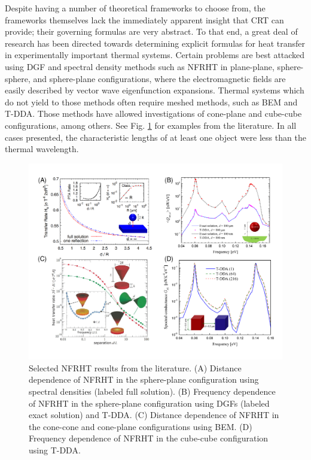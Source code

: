 Despite having a number of theoretical frameworks to choose from, the frameworks themselves lack the immediately apparent insight that CRT can provide; their governing formulas are very abstract. To that end, a great deal of research has been directed towards determining explicit formulas for heat transfer in experimentally important thermal systems. Certain problems are best attacked using DGF and spectral density methods such as NFRHT in plane-plane, \cite{Polder1971} sphere-sphere, \cite{Narayanaswamy2008, Mackowski2008, Kruger2012, Czapla2017} and sphere-plane \cite{Kruger2011, Otey2011} configurations, where the electromagnetic fields are easily described by vector wave eigenfunction expansions. Thermal systems which do not yield to those methods often require meshed methods, such as BEM and T-DDA. Those methods have allowed investigations of cone-plane \cite{Rodriguez2013, Edalatpour2016} and cube-cube \cite{Edalatpour2014} configurations, among others. See Fig. \ref{fig:ExactMethods} for examples from the literature. In all cases presented, the characteristic lengths of at least one object were less than the thermal wavelength. 

\begin{figure}
\centering
\includegraphics[width=\textwidth]{./Figures/ExactMethods.pdf}
\caption{\label{fig:ExactMethods}Selected NFRHT results from the literature. (A) Distance dependence of NFRHT in the sphere-plane configuration using spectral densities (labeled full solution).\cite{Kruger2011} (B) Frequency dependence of NFRHT in the sphere-plane configuration using DGFs (labeled exact solution) and T-DDA.\cite{Edalatpour2016} (C) Distance dependence of NFRHT in the cone-cone and cone-plane configurations using BEM.\cite{Rodriguez2013} (D) Frequency dependence of NFRHT in the cube-cube configuration using T-DDA.\cite{Edalatpour2014}}
\end{figure}


